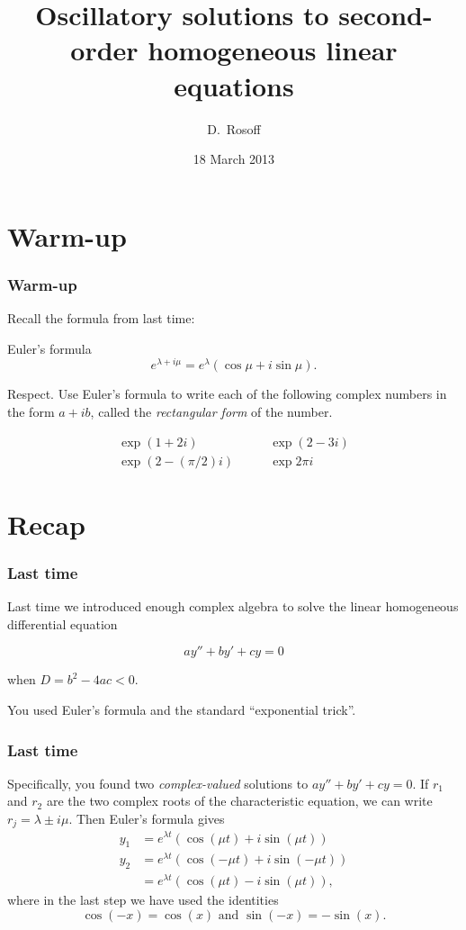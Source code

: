 \documentclass{beamer}
\title[Oscillations]{Oscillatory solutions to second-order homogeneous linear equations}
\author{D.\ Rosoff}
\institute{College of Idaho}
\date{18 March 2013}
\begin{document}
\begin{frame}
  \titlepage
\end{frame}

\section{Warm-up}
\begin{frame}[t]\frametitle{Warm-up}
    
Recall the formula from last time:
\pause
\begin{block}{Euler's formula}
    $$e^{\lambda + i \mu} = e^{\lambda} (\cos{\mu} + i \sin{\mu}).$$
\end{block}
\pause
Respect. Use Euler's formula to write each of the following complex numbers in the form $a + ib$, called the \emph{rectangular form} of the number.

\begin{align*}
    \exp(1 + 2i) \quad \quad & \exp(2-3i) \\
    \exp(2-(\pi/2)i) \quad \quad & \exp{2\pi i}
\end{align*}


\end{frame}
\section{Recap}

\begin{frame}\frametitle{Last time}
  Last time we introduced enough complex algebra to solve the linear homogeneous differential equation

  \[
    ay'' + by' + cy = 0
  \]

  when $D = b^2 - 4ac < 0$.

  You used Euler's formula and the standard ``exponential trick''.
\end{frame}

\begin{frame}[t]\frametitle{Last time}
    
  Specifically, you found two \emph{complex-valued} solutions to $ay'' + by' + cy = 0$. If $r_1$ and $r_2$ are the two complex roots of the characteristic equation, we can write $r_j = \lambda \pm i \mu $. Then Euler's formula gives
  \begin{align*}
      y_1 &= e^{\lambda t} (\cos{(\mu t)} + i \sin{(\mu t)}) \\
      y_2 &= e^{\lambda t} (\cos{(-\mu t)} + i \sin{(-\mu t)}) \\
                      &= e^{\lambda t} (\cos{(\mu t)} - i \sin{(\mu t)}),
  \end{align*}
  where in the last step we have used the identities 
  \[
    \cos{(-x)} = \cos{(x)} \text{ and } \sin{(-x)} = -\sin{(x)}.
  \]
\end{frame}
\end{document}
